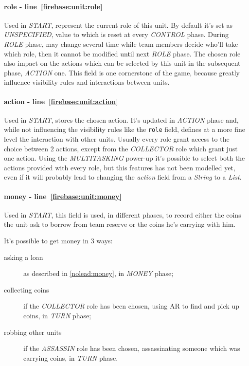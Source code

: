 				\paragraph{role - line~\ref{firebase:unit:role}}
				Used in \emph{START}, represent the current role of this unit. By default it's set as \emph{UNSPECIFIED}, value to which is reset at every \emph{CONTROL} phase.
				During \emph{ROLE} phase, may change several time while team members decide who'll take which role, then it cannot be modified until next \emph{ROLE} phase.
				The chosen role also impact on the actions which can be selected by this unit in the subsequent phase, \emph{ACTION} one.
				This field is one cornerstone of the game, because greatly influence visibility rules and interactions between units.
				
				\paragraph{action - line~\ref{firebase:unit:action}}
				Used in \emph{START}, stores the chosen action. It's updated in \emph{ACTION} phase and, while not influencing the visibility rules like the \lstinline|role| field, defines at a more fine level the interaction with other units. Usually every role grant access to the choice between 2 actions, except from the \emph{COLLECTOR} role which grant just one action. Using the \emph{MULTITASKING} power-up it's possible to select both the actions provided with every role, but this features has not been modelled yet, even if it will probably lead to changing the \emph{action} field from a \emph{String} to a \emph{List}.
				
				\paragraph{money - line~\ref{firebase:unit:money}}
				Used in \emph{START}, this field is used, in different phases, to record either the coins the unit ask to borrow from team reserve or the coins he's carrying with him.
				
				It's possible to get money in 3 ways:
				\begin{description}
					\item[asking a loan] as described in \autoref{nolead:money}, in \emph{MONEY} phase;
					\item[collecting coins] if the \emph{COLLECTOR} role has been chosen, using AR to find and pick up coins, in \emph{TURN} phase;
					\item[robbing other units] if the \emph{ASSASSIN} role has been chosen, assassinating someone which was carrying coins, in \emph{TURN} phase.
				\end{description}
			
